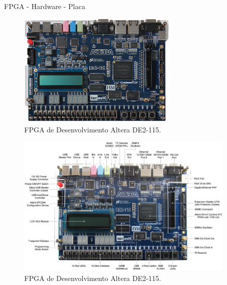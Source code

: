 \documentclass[aspectratio=169]{beamer}
\begin{document}
	\begin{frame}{FPGA - Hardware - Placa}
		\begin{figure}[p]
			\centering
			\includegraphics[width=0.68\textwidth]{img/fpga/terasic_placa.jpg}
			\caption{FPGA de Desenvolvimento Altera DE2-115.}
			\label{fig:terasic_placa}
		\end{figure}
	\end{frame}
	
	\begin{frame}%
		\begin{figure}[p]
			\centering
			\includegraphics[width=0.93\textwidth]{img/fpga/terasic_placa_detalhado.jpg}
			\caption{FPGA de Desenvolvimento Altera DE2-115.}
			\label{fig:terasic_placa2}
		\end{figure}
	\end{frame}
\end{document}
